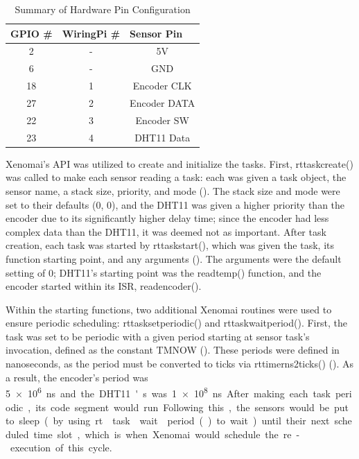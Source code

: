 \documentclass[letterpaper, 12pt]{article}
\begin{document}
\begin{table}[hbt]
	\centering
	\caption{Summary of Hardware Pin Configuration}
	\label{my-label}
	\begin{tabular}{|c|c|c|}
		\hline
		\multicolumn{1}{|l|}{GPIO \#} & \multicolumn{1}{l|}{WiringPi \#} & \multicolumn{1}{l|}{Sensor Pin} \\ \hline
		2                             & -                                & 5V                              \\ \hline
		6                             & -                                & GND                             \\ \hline
		18                            & 1                                & Encoder CLK                     \\ \hline
		27                            & 2                                & Encoder DATA                    \\ \hline
		22                            & 3                                & Encoder SW                      \\ \hline
		23                            & 4                                & DHT11 Data                      \\ \hline
	\end{tabular}
\end{table}

\indent Xenomai's API was utilized to create and initialize the tasks.  First, rt\textunderscore task\textunderscore create() was called to make each sensor reading a task: each was given a task object, the sensor name, a stack size, priority, and mode (\cite{xenomai2018}).  The stack size and mode were set to their defaults (0, 0), and the DHT11 was given a higher priority than the encoder due to its significantly higher delay time; since the encoder had less complex data than the DHT11, it was deemed not as important.  After task creation, each task was started by rt\textunderscore task\textunderscore start(), which was given the task, its function starting point, and any arguments (\cite{xenomai2018}).  The arguments were the default setting of 0; DHT11's starting point was the read\textunderscore temp() function, and the encoder started within its ISR, read\textunderscore encoder().

\indent Within the starting functions, two additional Xenomai routines were used to ensure periodic scheduling: rt\textunderscore task\textunderscore set\textunderscore periodic() and rt\textunderscore task\textunderscore wait\textunderscore period().  First, the task was set to be periodic with a given period starting at sensor task's invocation, defined as the constant TM\textunderscore NOW (\cite{xenomai2018}).  These periods were defined in nanoseconds, as the period must be converted to ticks via rt\textunderscore timer\textunderscore ns2ticks() (\cite{xenomai2018}).  As a result, the encoder's period was \SI{5e6} ns and the DHT11's was \SI{1e8} ns.  After making each task periodic, its code segment would run.  Following this, the sensors would be put to sleep (by using rt\textunderscore task\textunderscore wait\textunderscore period() to wait) until their next scheduled time slot, which is when Xenomai would schedule the re-execution of this cycle.
\end{document}
